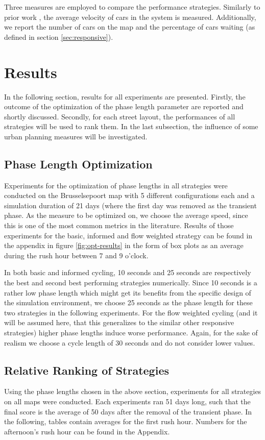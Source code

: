 \documentclass[11pt]{article}
\begin{document}
Three measures are employed to compare the performance strategies. Similarly to prior work \citep{srinivasan2006neural}, the average velocity of cars in the system is measured. Additionally, we report the number of cars on the map and the percentage of cars waiting (as defined in section \ref{sec:responsive}).

\section{Results}
\label{sec:results}
In the following section, results for all experiments are presented. Firstly, the outcome of the optimization of the phase length parameter are reported and shortly discussed. Secondly, for each street layout, the performances of all strategies will be used to rank them. In the last subsection, the influence of some urban planning measures will be investigated.

\subsection{Phase Length Optimization}
Experiments for the optimization of phase lengths in all strategies were conducted on the Brusselsepoort map with 5 different configurations each and a simulation duration of 21 days (where the first day was removed as the transient phase. As the measure to be optimized on, we choose the average speed, since this is one of the most common metrics in the literature. Results of those experiments for the basic, informed and flow weighted strategy can be found in the appendix in figure \ref{fig:opt-results} in the form of box plots as an average during the rush hour between 7 and 9 o'clock.

In both basic and informed cycling, 10 seconds and 25 seconds are respectively the best and second best performing strategies numerically. Since 10 seconds is a rather low phase length which might get its benefits from the specific design of the simulation environment, we choose 25 seconds as the phase length for these two strategies in the following experiments. For the flow weighted cycling (and it will be assumed here, that this generalizes to the similar other responsive strategies) higher phase lengths induce worse performance. Again, for the sake of realism we choose a cycle length of 30 seconds and do not consider lower values.

\subsection{Relative Ranking of Strategies}
Using the phase lengths chosen in the above section, experiments for all strategies on all maps were conducted. Each experiments ran 51 days long, such that the final score is the average of 50 days after the removal of the transient phase. In the following, tables contain averages for the first rush hour. Numbers for the afternoon's rush hour can be found in the Appendix.
\end{document}
